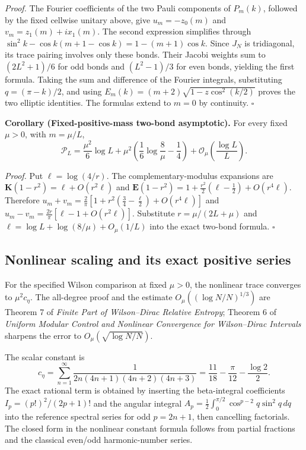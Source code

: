 \documentclass[
  10pt,
  a4paper,
]{article}
\begin{document}
\emph{Proof.} The Fourier coefficients of the two Pauli components of \(P_m(k)\), followed by the fixed cellwise unitary above, give \(u_m=-z_0(m)\) and \(v_m=z_1(m)+ix_1(m)\). The second expression simplifies through \(\sin^2k-\cos k(m+1-\cos k)=1-(m+1)\cos k\). Since \(J_N\) is tridiagonal, its trace pairing involves only these bonds. Their Jacobi weights sum to \((2L^2+1)/6\) for odd bonds and \((L^2-1)/3\) for even bonds, yielding the first formula. Taking the sum and difference of the Fourier integrals, substituting \(q=(\pi-k)/2\), and using \(E_m(k)=(m+2)\sqrt{1-z\cos^2(k/2)}\) proves the two elliptic identities. The formulas extend to \(m=0\) by continuity. \(\square\)

\textbf{Corollary (Fixed-positive-mass two-bond asymptotic).} For every fixed \(\mu>0\), with \(m=\mu/L\), \begin{equation}
\label{eq:Pestimate}
\mathcal P_L=\frac{\mu^2}{6}\log L+
\mu^2\left(\frac16\log\frac8\mu-\frac14\right)
+\mathcal O_\mu\left(\frac{\log L}{L}\right).
\end{equation}

\emph{Proof.} Put \(\ell=\log(4/r)\). The complementary-modulus expansions are \(\mathbf K(1-r^2)=\ell+O(r^2\ell)\) and \(\mathbf E(1-r^2)=1+\frac{r^2}{2}(\ell-\frac12)+O(r^4\ell)\). Therefore \(u_m+v_m=\frac2\pi[1+r^2(\frac34-\frac\ell2)+O(r^4\ell)]\) and \(u_m-v_m=\frac{2r}\pi[\ell-1+O(r^2\ell)]\). Substitute \(r=\mu/(2L+\mu)\) and \(\ell=\log L+\log(8/\mu)+O_\mu(1/L)\) into the exact two-bond formula. \(\square\)

\subsection{Nonlinear scaling and its exact positive series}\label{nonlinear-scaling-and-its-exact-positive-series}

For the specified Wilson comparison at fixed \(\mu>0\), the nonlinear trace converges to \(\mu^2c_\eta\). The all-degree proof and the estimate \(O_\mu((\log N/N)^{1/3})\) are Theorem 7 of \emph{Finite Part of Wilson--Dirac Relative Entropy}; Theorem 6 of \emph{Uniform Modular Control and Nonlinear Convergence for Wilson--Dirac Intervals} sharpens the error to \(O_\mu(\sqrt{\log N/N})\).

The scalar constant is \begin{equation}
\label{eq:constant}
c_\eta=\sum_{n=1}^{\infty}\frac{1}{2n(4n+1)(4n+2)(4n+3)}
=\frac{11}{18}-\frac\pi{12}-\frac{\log2}{2}.
\end{equation} The exact rational term is obtained by inserting the beta-integral coefficients \(I_p=(p!)^2/(2p+1)!\) and the angular integral \(A_p=\frac12\int_0^{\pi/2}\cos^{p-2}q\sin^2q\,dq\) into the reference spectral series for odd \(p=2n+1\), then cancelling factorials. The closed form in the nonlinear constant formula follows from partial fractions and the classical even/odd harmonic-number series.
\end{document}
